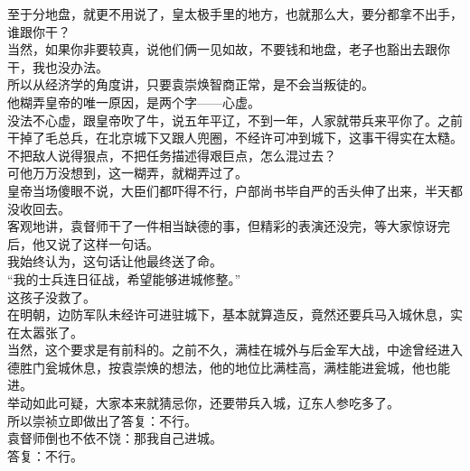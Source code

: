 \begin{multicols}{\theparacolNo}
至于分地盘，就更不用说了，皇太极手里的地方，也就那么大，要分都拿不出手，谁跟你干？\\

当然，如果你非要较真，说他们俩一见如故，不要钱和地盘，老子也豁出去跟你干，我也没办法。\\

所以从经济学的角度讲，只要袁崇焕智商正常，是不会当叛徒的。\\

他糊弄皇帝的唯一原因，是两个字——心虚。\\

没法不心虚，跟皇帝吹了牛，说五年平辽，不到一年，人家就带兵来平你了。之前干掉了毛总兵，在北京城下又跟人兜圈，不经许可冲到城下，这事干得实在太糙。\\

不把敌人说得狠点，不把任务描述得艰巨点，怎么混过去？\\

可他万万没想到，这一糊弄，就糊弄过了。\\

皇帝当场傻眼不说，大臣们都吓得不行，户部尚书毕自严的舌头伸了出来，半天都没收回去。\\

客观地讲，袁督师干了一件相当缺德的事，但精彩的表演还没完，等大家惊讶完后，他又说了这样一句话。\\

我始终认为，这句话让他最终送了命。\\

“我的士兵连日征战，希望能够进城修整。”\\

这孩子没救了。\\

在明朝，边防军队未经许可进驻城下，基本就算造反，竟然还要兵马入城休息，实在太嚣张了。\\

当然，这个要求是有前科的。之前不久，满桂在城外与后金军大战，中途曾经进入德胜门瓮城休息，按袁崇焕的想法，他的地位比满桂高，满桂能进瓮城，他也能进。\\

举动如此可疑，大家本来就猜忌你，还要带兵入城，辽东人参吃多了。\\

所以崇祯立即做出了答复：不行。\\

袁督师倒也不依不饶：那我自己进城。\\

答复：不行。\\


\end{multicols}
